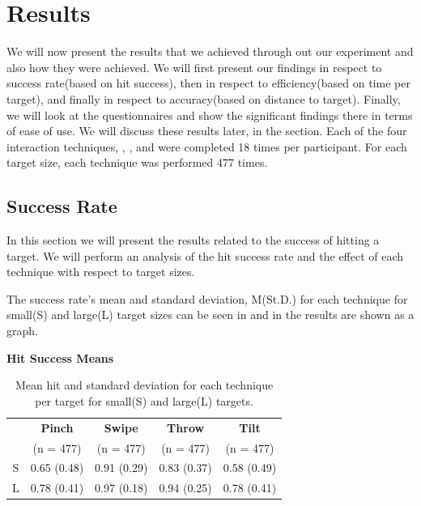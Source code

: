 \section{Results}
We will now present the results that we achieved through out our experiment and also how they were achieved. We will first present our findings in respect to success rate(based on hit success), then in respect to efficiency(based on time per target), and finally in respect to accuracy(based on distance to target). Finally, we will look at the questionnaires and show the significant findings there in terms of ease of use. We will discuss these results later, in the  section.  
Each of the four interaction techniques, \pinch, \swipe, \throw and \tilt were completed 18 times per participant. 
For each target size, each technique was performed 477 times. 

\subsection{Success Rate}
In this section we will present the results related to the success of hitting a target.
We will perform an analysis of the hit success rate and the effect of each technique with respect to target sizes.

The success rate's mean and standard deviation, M(St.D.) for each technique for small(S) and large(L) target sizes can be seen in  and in  the results are shown as a graph.

\begin{table}[H]
	\centering
	\textbf{Hit Success Means}\\[4pt]
	\begin{adjustbox}{width=\columnwidth}
	\begin{tabular}{|c|c|c|c|c|}
			\hline
			\rowcolor[HTML]{9B9B9B} 
			& \textbf{Pinch} & \textbf{Swipe} & \textbf{Throw} & \textbf{Tilt} \\
			\rowcolor[HTML]{9B9B9B} 
			 & (n = 477) & (n = 477) & (n = 477) & (n = 477) \\ \hline
			S & 0.65 (0.48)       & 0.91 (0.29)         & 0.83 (0.37)         & 0.58 (0.49)        \\ \hline
			L & 0.78 (0.41)        & 0.97 (0.18)         & 0.94 (0.25)        & 0.78 (0.41)       \\ \hline
	\end{tabular}
	\end{adjustbox}
	\caption{Mean hit  and standard deviation for each technique per target for small(S) and large(L) targets.}
	\label{tab:meanHitTechnique}
\end{table}

